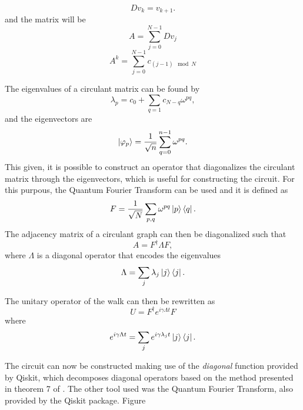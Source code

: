 \documentclass[../../dissertation.tex]{subfiles}
\begin{document}
\begin{equation}
    Dv_k = v_{k+1}.
\end{equation}
and the matrix will be
\begin{equation}
	A = \sum_{j=0}^{N-1} D v_j 
\end{equation}
\begin{equation}
	A^k = \sum_{j=0}^{N-1} c_{(j-1)\mod{N}}
\end{equation}\par
The eigenvalues of a circulant matrix can be found by
\begin{equation}
\lambda_p = c_0 + \sum_{q=1} c_{N-q} \omega^{pq},
\end{equation}
and the eigenvectors are 
\begin{equation}
\ket{\varphi_p} = \frac{1}{\sqrt{n}} \sum_{q=0}^{n-1} \omega^{pq}.
\end{equation}
This given, it is possible to construct an operator that diagonalizes the circulant matrix through the eigenvectors, which is useful for constructing the circuit. For this purpous, the Quantum Fourier Transform can be used and it is defined as 
\begin{equation}
F = \frac{1}{\sqrt{N}} \sum_{p,q} \omega^{pq} \ket{p}\bra{q}.
\end{equation}
The adjacency matrix of a circulant graph can then be diagonalized such that
\begin{equation}\label{eq:diag_adj}
    A = F^{\dagger} \Lambda F,
\end{equation}
where $\Lambda$ is a diagonal operator that encodes the eigenvalues
\begin{equation}
\Lambda = \sum_{j} \lambda_j \ket{j}\bra{j}.
\end{equation}\par
The unitary operator of the walk can then be rewritten as
\begin{equation}\label{eq:uqft}
    U = F^{\dagger}e^{i\gamma \Lambda t} F
\end{equation}
where
\begin{equation}
    e^{i\gamma \Lambda t} = \sum_{j} e^{i\gamma \lambda_j t} \ket{j}\bra{j}.
\end{equation}\par
The circuit can now be constructed making use of the \textit{diagonal} function provided by Qiskit, which decomposes diagonal operators based on the method presented in theorem 7 of \cite{Shende06}. The other tool used was the Quantum Fourier Transform, also provided by the Qiskit package. Figure 
\end{document}
